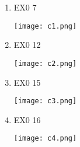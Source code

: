 \documentclass[a4paper,11pt]{article}
\begin{document}
	
\begin{enumerate}
	\item EX0 7
	
	
	\texttt{[image: c1.png]}
	
	
	\item EX0 12
	
	
	\texttt{[image: c2.png]}
	
	\item EX0 15
	
	
	\texttt{[image: c3.png]}
	
	\item EX0 16
	
	
	\texttt{[image: c4.png]}
	
	
	
\end{enumerate}	
\end{document}
